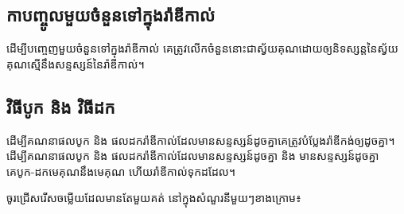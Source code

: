 \subsection{កាបញ្ចូលមួយចំនួនទៅក្នុងរ៉ាឌីកាល់}
\begin{general}
ដើម្បីបញ្ចេញមួយចំនួនទៅក្នុងរ៉ាឌីកាល់ គេត្រូវលើកចំនួននោះជាស្វ័យគុណដោយឲ្យនិទស្សន្តនៃស្វ័យគុណស្មើនឹងសន្ទស្សន៍នៃរ៉ាឌីកាល់។
\end{general}
\subsection{វិធីបូក និង វិធីដក}

\begin{general}
ដើម្បីគណនាផលបូក និង ផលដករ៉ាឌីកាល់ដែលមានសន្ទស្សន៍ដូចគ្នាគេត្រូវបំប្លែងរ៉ាឌីកង់ឲ្យដូចគ្នា។ 
ដើម្បីគណនាផលបូក និង ផលដករ៉ាឌីកាល់ដែលមានសន្ទស្សន៍ដូចគ្នា និង មានសន្ទស្សន៍ដូចគ្នា គេបូក-ដកមេគុណនឹងមេគុណ ហើយរ៉ាឌីកាល់ទុកដដែល។
\end{general}
\newpage
\pros
\begin{center}
ចូរជ្រើសរើសចម្លើយដែលមានតែមួយគត់ នៅក្នុងសំណួរនីមួយៗខាងក្រោម៖
\end{center}

